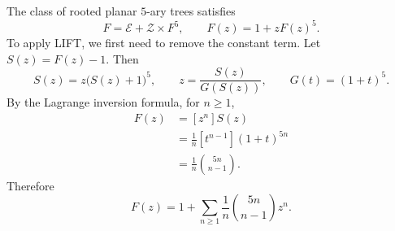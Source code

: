 \begin{example}
The class of rooted planar $5$-ary trees satisfies
\[
F=\mathcal E+\mathcal Z\times F^5,
\qquad F(z)=1+zF(z)^5.
\]
To apply LIFT, we first need to remove the constant term.
Let $S(z)=F(z)-1$. Then
\[
S(z)=z\bigl(S(z)+1\bigr)^5,
\qquad z=\frac{S(z)}{G(S(z))},\qquad G(t)=(1+t)^5.
\]
By the Lagrange inversion formula, for $n\ge1$,
\begin{align*}
[z^n]F(z)&=[z^n]S(z)\\
&=\frac1n[t^{n-1}](1+t)^{5n}\\
&=\frac1n\binom{5n}{n-1}.
\end{align*}
Therefore
\[
F(z)=1+\sum_{n\ge1}\frac1n\binom{5n}{n-1}z^n.
\]

\end{example}
